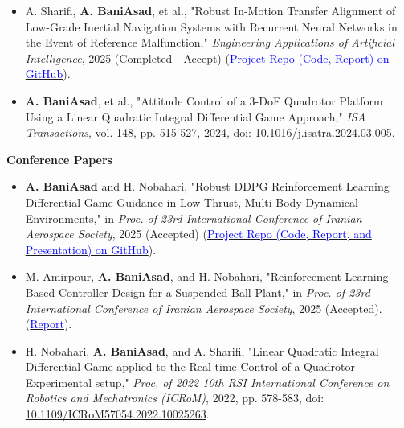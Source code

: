\documentclass[12pt]{article}
\newcommand{\etal}{{et al.}}
\begin{document}
\begin{itemize} \itemsep -1pt %
	\item A. Sharifi, \textbf{A. BaniAsad}, et al., "Robust In-Motion Transfer Alignment of Low-Grade Inertial Navigation Systems with Recurrent Neural Networks in the Event of Reference Malfunction," \textit{Engineering Applications of Artificial Intelligence}, 2025 (Completed - Accept)
(\href{https://github.com/alibaniasad1999/INS-AI}{\textcolor{blue}{Project Repo (Code, Report) on GitHub}}).
	\item \textbf{A. BaniAsad}, et al., "Attitude Control of a 3-DoF Quadrotor Platform Using a Linear Quadratic Integral Differential Game Approach," \textit{ISA Transactions}, vol. 148, pp. 515-527, 2024, doi: \href{https://doi.org/10.1016/j.isatra.2024.03.005}{10.1016/j.isatra.2024.03.005}.
\end{itemize}

\noindent
{\bfseries Conference Papers}

\begin{itemize} \itemsep -1pt %
    \item \textbf{A. BaniAsad} and H. Nobahari, "Robust DDPG Reinforcement Learning Differential Game Guidance in Low-Thrust, Multi-Body Dynamical Environments," in \textit{Proc. of 23rd International Conference of Iranian Aerospace Society}, 2025 (Accepted) (\href{https://github.com/alibaniasad1999/DGDDPG}{\textcolor{blue}{Project Repo (Code, Report, and Presentation) on GitHub}}).
    \item M. Amirpour, \textbf{A. BaniAsad}, and H. Nobahari, "Reinforcement Learning-Based Controller Design for a Suspended Ball Plant," in \textit{Proc. of 23rd International Conference of Iranian Aerospace Society}, 2025 (Accepted).
   (\href{https://drive.google.com/file/d/18oinC3TNsnMand_cw5BN_Z3qxRAvds8u/view?usp=sharing}{\textcolor{blue}{Report}}).
	\item H. Nobahari, \textbf{A. BaniAsad}, and A. Sharifi, "Linear Quadratic Integral Differential Game applied to the Real-time Control of a Quadrotor Experimental setup," \textit{Proc. of 2022 10th RSI International Conference on Robotics and Mechatronics (ICRoM)}, 2022, pp. 578-583, doi: \href{https://doi.org/10.1109/ICRoM57054.2022.10025263}{10.1109/ICRoM57054.2022.10025263}.
\end{itemize}
\end{document}
